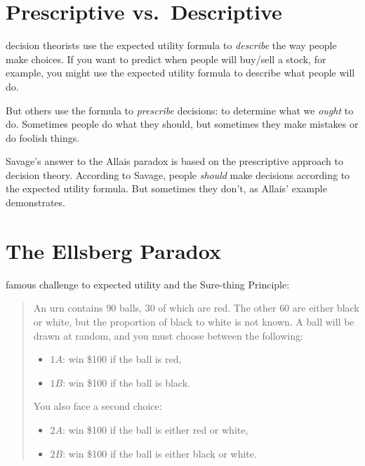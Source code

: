 \documentclass[justified]{tufte-book}
\providecommand{\tightlist}{%
  \setlength{\itemsep}{0pt}\setlength{\parskip}{0pt}}
\newenvironment{puzzle}{\begin{quote}\normalsize}{\end{quote}}
\theoremstyle{definition}
\theoremstyle{definition}
\theoremstyle{definition}
\theoremstyle{remark}
\begin{document}
\hypertarget{prescriptive-vs.descriptive}{%
\section{Prescriptive vs.~Descriptive}\label{prescriptive-vs.descriptive}}

 decision theorists use the expected utility formula to \emph{describe} the way people make choices. If you want to predict when people will buy/sell a stock, for example, you might use the expected utility formula to describe what people will do.

But others use the formula to \emph{prescribe} decisions: to determine what we \emph{ought} to do. Sometimes people do what they should, but sometimes they make mistakes or do foolish things.

Savage's answer to the Allais paradox is based on the prescriptive approach to decision theory. According to Savage, people \emph{should} make decisions according to the expected utility formula. But sometimes they don't, as Allais' example demonstrates.

\hypertarget{the-ellsberg-paradox}{%
\section{The Ellsberg Paradox}\label{the-ellsberg-paradox}}

 famous challenge to expected utility and the Sure-thing Principle:

\begin{puzzle}
An urn contains \(90\) balls, \(30\) of which are red. The other \(60\)
are either black or white, but the proportion of black to white is not
known. A ball will be drawn at random, and you must choose between the
following:

\begin{itemize}
\tightlist
\item
  \(1A\): win \$100 if the ball is red,
\item
  \(1B\): win \$100 if the ball is black.
\end{itemize}

You also face a second choice:

\begin{itemize}
\tightlist
\item
  \(2A\): win \$100 if the ball is either red or white,
\item
  \(2B\): win \$100 if the ball is either black or white.
\end{itemize}
\end{puzzle}
\end{document}
